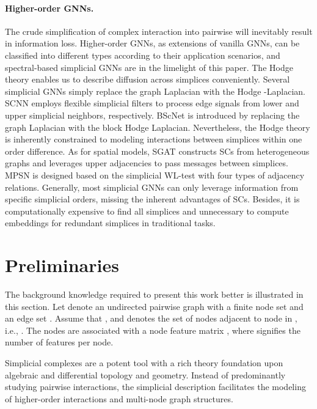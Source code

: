 \documentclass[letterpaper]{article} \usepackage{aaai24}
\theoremstyle{plain}
\theoremstyle{definition}
\theoremstyle{remark}
\begin{document}
\paragraph{Higher-order GNNs.} 

The crude simplification of complex interaction into pairwise will inevitably result in information loss. 
Higher-order GNNs, as extensions of vanilla GNNs, can be classified into different types according to their application scenarios, and spectral-based simplicial GNNs are in the limelight of this paper.
The Hodge theory \cite{Hodge_Hatcher} enables us to describe diffusion across simplices conveniently.
Several simplicial GNNs \cite{SNN2020, SCoNe21Roddenberry} simply replace the graph Laplacian with the Hodge -Laplacian. 
SCNN \cite{SCNN2022} employs flexible simplicial filters to process edge signals from lower and upper simplicial neighbors, respectively. 
BScNet \cite{BScNets} is introduced by replacing the graph Laplacian with the block Hodge Laplacian. Nevertheless, the Hodge theory is inherently constrained to modeling interactions between simplices within one order difference.
As for spatial models, SGAT \cite{SGAT} constructs SCs from heterogeneous graphs and leverages upper adjacencies to pass messages between simplices.
MPSN \cite{SWL2021} is designed based on the simplicial WL-test with four types of adjacency relations. 
Generally, most simplicial GNNs can only leverage information from specific simplicial orders, missing the inherent advantages of SCs.
Besides, it is computationally expensive to find all simplices \cite{maxClique1999} and unnecessary to compute embeddings for redundant simplices in traditional tasks.

\section{Preliminaries}






The background knowledge required to present this work better is illustrated in this section.
Let  denote an undirected pairwise graph with a finite node set  and an edge set . Assume that , and  denotes the set of nodes adjacent to node  in , i.e., .
The nodes are associated with a node feature matrix , where  signifies the number of features per node.




Simplicial complexes \cite{HigherOrderReview2020} are a potent tool with a rich theory foundation upon algebraic and differential topology and geometry. 
Instead of predominantly studying pairwise interactions, the simplicial description facilitates the modeling of higher-order interactions and multi-node graph structures.
\end{document}
